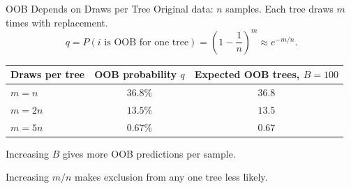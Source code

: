 \begin{frame}{OOB Depends on Draws per Tree}
  Original data: $n$ samples. Each tree draws $m$ times with replacement.
  \pause
  \[q=P(i\text{ is OOB for one tree})=
    \left(1-\frac1n\right)^m\approx e^{-m/n}.\]
  \pause
  \centering
  \renewcommand{\arraystretch}{1.15}
  \begin{tabular}{lcc}
    \toprule
    Draws per tree & OOB probability $q$ & Expected OOB trees, $B=100$\\ \midrule
    $m=n$ & $36.8\%$ & $36.8$\\
    $m=2n$ & $13.5\%$ & $13.5$\\
    $m=5n$ & $0.67\%$ & $0.67$\\ \bottomrule
  \end{tabular}
  \vspace{.3cm}
  \par Increasing $B$ gives more OOB predictions per sample.\par
  \vspace{.18cm}
  Increasing $m/n$ makes exclusion from any one tree less likely.
\end{frame}
